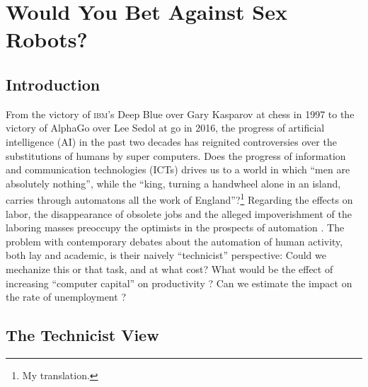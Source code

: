 \documentclass[version=last,draft=false,paper=A4,portrait,twoside=true,twocolumn=false,headinclude=false,footinclude=false,mpinclude=true,fontsize=12,BCOR=20mm,DIV=calc,pagesize=auto,open=right,chapterprefix=true,numbers=autoendperiod,headsepline=false,headings=twolinechapter,parskip=false]{scrbook}
\begin{document}
\chapter{Would You Bet Against Sex Robots?}
\label{sec:org4a28df8}
\section{Introduction}
\label{sec:org0f2bc4b}
From the victory of \textsc{ibm}'s Deep Blue over Gary Kasparov at chess in
1997 to the victory of AlphaGo over Lee Sedol at go in 2016, the progress
of artificial intelligence (AI) in the past two decades has reignited
controversies over the substitutions of humans by super computers. Does the
progress of information and communication technologies (ICTs) drives us to
a world in which ``men are absolutely nothing'', while the ``king, turning
a handwheel alone in an island, carries through automatons all the work of
England''\autocite[330]{sismondi1819_2}?\footnote{My translation.} Regarding the effects on
labor, the disappearance of obsolete jobs and the alleged impoverishment of
the laboring masses preoccupy the optimists in the prospects of automation
\autocite{ford2009}. The problem with contemporary debates about the
automation of human activity, both lay and academic, is their naively
``technicist'' perspective: Could we mechanize this or that task, and at
what cost? What would be the effect of increasing ``computer capital'' on
productivity \autocite{frey_osborne2013}? Can we estimate the impact on the
rate of unemployment \autocite{acemoglu_restrepo2018}?

\section{The Technicist View}
\label{sec:org0c20145}
\end{document}
